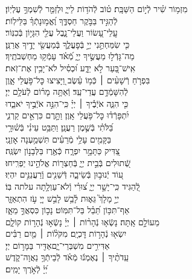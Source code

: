 \documentclass[twoside, openany, parskip=half, 11pt]{book}
\begin{document}
\begin{narrow}
מִזְמ֥וֹר שִׁ֗יר לְֿי֣וֹם הַשַּׁבָּֽת׃\hfill \break
ט֗וֹב לְֿהֹד֥וֹת לַייָ֑ \hfill וּלְזַמֵּ֖ר לְֿשִׁמְךָ֣ עֶלְיֽוֹן׃ \\
לְֿהַגִּ֣יד בַּבֹּ֣קֶר חַסְדֶּ֑ךָ \hfill וֶ֝אֱמ֥וּנָתְֿךָ֗ בַּלֵּילֽוֹת׃ \\
עֲֽלֵי־עָ֭שׂוֹר וַעֲלֵי־נָ֑בֶל \hfill עֲלֵ֖י הִגָּי֣וֹן בְּֿכִנּֽוֹר׃ \\
כִּ֤י שִׂמַּחְתַּ֣נִי יְיָ֣ בְּֿפׇעֳלֶ֑ךָ \hfill בְּֽֿמַעֲשֵׂ֖י יָדֶ֣יךָ אֲרַנֵּֽן׃ \\
מַה־גָּדְֿל֣וּ מַעֲשֶׂ֣יךָ יְיָ֑ \hfill מְֿ֝אֹ֗ד עָמְֿק֥וּ מַחְשְׁבֹתֶֽיךָ׃ \\
אִֽישׁ־בַּ֭עַר לֹ֣א יֵדָ֑ע \hfill וּ֝כְסִ֗יל לֹא־יָבִ֥ין אֶת־זֹֽאת׃ \\
בִּפְרֹ֤חַ רְֿשָׁעִ֨ים ׀ כְּֿמ֥וֹ עֵ֗שֶׂב \hfill וַ֭יָּצִיצוּ כׇּל־פֹּ֣עֲלֵי אָ֑וֶן\\ לְֿהִשָּׁמְֿדָ֥ם עֲדֵי־עַֽד׃ \hfill
וְֿאַתָּ֥ה מָר֗וֹם לְֿעֹלָ֥ם יְיָ׃ \\
כִּ֤י הִנֵּ֪ה אֹיְֿבֶ֡יךָ ׀ יְיָ֗ \hfill כִּֽי־הִנֵּ֣ה אֹיְֿבֶ֣יךָ יֹאבֵ֑דוּ\\ יִ֝תְפָּרְֿד֗וּ כׇּל־פֹּ֥עֲלֵי אָֽוֶן׃ \hfill
וַתָּ֣רֶם כִּרְאֵ֣ים קַרְנִ֑י\\ בַּ֝לֹּתִ֗י בְּֿשֶׁ֣מֶן רַעֲנָֽן׃ \hfill
וַתַּבֵּ֥ט עֵינִ֗י בְּֿשׁ֫וּרָ֥י\\ בַּקָּמִ֖ים עָלַ֥י מְֿרֵעִ֗ים \hfill תִּשְׁמַ֥עְנָה אׇזְנָֽי׃ \\
צַ֭דִּיק כַּתָּמָ֣ר יִפְרָ֑ח \hfill כְּֿאֶ֖רֶז בַּלְּבָנ֣וֹן יִשְׂגֶּֽה׃ \\
שְֿׁ֭תוּלִים בְּֿבֵ֣ית יְיָ֑ \hfill בְּֿחַצְר֖וֹת אֱלֹהֵ֣ינוּ יַפְרִֽיחוּ׃ \\
ע֭וֹד יְֿנוּב֣וּן בְּֿשֵׂיבָ֑ה \hfill דְּֿשֵׁנִ֖ים וְֽֿרַעֲנַנִּ֣ים יִהְיֽוּ׃ \\
לְֿ֭הַגִּיד כִּֽי־יָשָׁ֣ר יְיָ֑ \hfill צ֝וּרִ֗י וְֽֿלֹא־עַוְלָ֥תָה עלתה בּֽוֹ׃ \\



יְיָ֣ מָלָךְ֮ גֵּא֢וּת לָ֫בֵ֥שׁ\hfill
לָבֵ֣שׁ יְיָ֭ עֹ֣ז הִתְאַזָּ֑ר\\ אַף־תִּכּ֥וֹן תֵּ֝בֵ֗ל בַּל־תִּמּֽוֹט׃ \hfill
נָכ֣וֹן כִּסְאֲךָ֣ מֵאָ֑ז\\ מֵעוֹלָ֣ם אָֽתָּה׃ \hfill
נָשְֿׂא֤וּ נְֿהָר֨וֹת ׀ יְיָ֗ נָשְֿׂא֣וּ נְֿהָר֣וֹת קוֹלָ֑ם\\ יִשְׂא֖וּ נְֿהָר֣וֹת דׇּכְיָֽם׃ \hfill
מִקֹּל֨וֹת ׀ מַ֤יִם רַבִּ֗ים\\ אַדִּירִ֣ים מִשְׁבְּרֵי־יָ֑ם\hfill אַדִּ֖יר בַּמָּר֣וֹם יְיָ׃ \\
עֵֽדֹתֶ֨יךָ ׀ נֶאֶמְנ֬וּ מְֿאֹ֗ד \hfill לְֿבֵיתְֿךָ֥ נַאֲוָה־קֹ֑דֶשׁ\\ יְ֝יָ֗ לְֿאֹ֣רֶךְ יָמִֽים׃ \hfill \break

\end{narrow}
\end{document}

